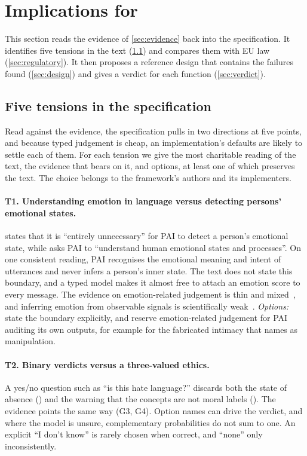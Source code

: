 \section{Implications for \pol{}}
\label{sec:implications}

This section reads the evidence of \cref{sec:evidence} back into the specification.
It identifies five tensions in the text (\cref{sec:synthesis}) and compares them with EU law (\cref{sec:regulatory}). It then proposes a reference design that contains the failures found (\cref{sec:design}) and gives a verdict for each \pol{} function (\cref{sec:verdict}).

\subsection{Five tensions in the specification}
\label{sec:synthesis}

Read against the evidence, the specification pulls in two directions at five points, and because typed judgement is cheap, an implementation's defaults are likely to settle each of them.
For each tension we give the most charitable reading of the text, the evidence that bears on it, and options, at least one of which preserves the text.
The choice belongs to the framework's authors and its implementers.

\paragraph{T1. Understanding emotion in language versus detecting persons' emotional states.}
 states that it is ``entirely unnecessary'' for PAI to detect a person's emotional state, while  asks PAI to ``understand human emotional states and processes''.
On one consistent reading, PAI recognises the emotional meaning and intent of utterances and never infers a person's inner state.
The text does not state this boundary, and a typed model makes it almost free to attach an emotion score to every message.
The evidence on emotion-related judgement is thin and mixed~\cite{arx24574,arx35293}, and inferring emotion from observable signals is scientifically weak~\cite{barrett2019emotional}.
\emph{Options:} state the boundary explicitly, and reserve emotion-related judgement for PAI auditing its own outputs, for example for the fabricated intimacy that  names as manipulation.

\paragraph{T2. Binary verdicts versus a three-valued ethics.}
A yes/no question such as ``is this hate language?'' discards both the state of absence () and the warning that the concepts are not moral labels ().
The evidence points the same way (G3, G4).
Option names can drive the verdict, and where the model is unsure, complementary probabilities do not sum to one.
An explicit ``I don't know'' is rarely chosen when correct, and ``none'' only inconsistently.

